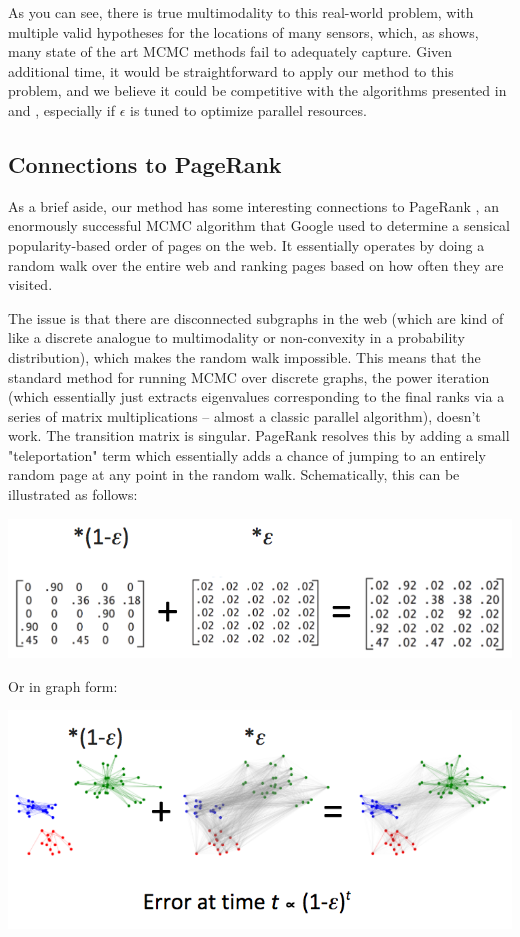 \documentclass{article}
\begin{document}
As you can see, there is true multimodality to this real-world problem, with
multiple valid hypotheses for the locations of many sensors, which, as
\cite{wormhole} shows, many state of the art MCMC methods fail to adequately
capture. Given additional time, it would be straightforward to apply our method
to this problem, and we believe it could be competitive with the algorithms
presented in \cite{wormhole} and \cite{darting}, especially if $\epsilon$
is tuned to optimize parallel resources.

\subsection{Connections to PageRank}

As a brief aside, our method has some interesting connections to PageRank
\cite{pagerank}, an enormously successful MCMC algorithm that Google used to
determine a sensical popularity-based order of pages on the web. It essentially
operates by doing a random walk over the entire web and ranking pages based on
how often they are visited.

The issue is that there are disconnected subgraphs in the web (which are kind
of like a discrete analogue to multimodality or non-convexity in a probability
distribution), which makes the random walk impossible. This means that the
standard method for running MCMC over discrete graphs, the power iteration
(which essentially just extracts eigenvalues corresponding to the final ranks
via a series of matrix multiplications -- almost a classic parallel algorithm),
doesn't work. The transition matrix is singular. PageRank resolves this by
adding a small "teleportation" term which essentially adds a chance of jumping
to an entirely random page at any point in the random walk. Schematically, this
can be illustrated as follows:

\includegraphics[width=\textwidth]{pagerank-mat.png}

Or in graph form:

\includegraphics[width=\textwidth]{pagerank-graph.png}
\end{document}
